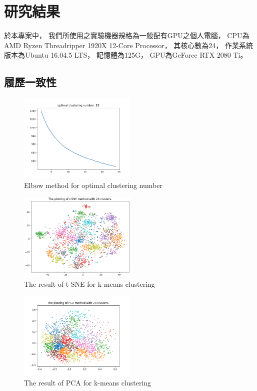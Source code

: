\documentclass[acmsmall]{acmart}
\begin{document}
\section{研究結果}

於本專案中，
我們所使用之實驗機器規格為一般配有GPU之個人電腦，
CPU為AMD Ryzen Threadripper 1920X 12-Core Processor，
其核心數為24，
作業系統版本為Ubuntu 16.04.5 LTS，
記憶體為125G，
GPU為GeForce RTX 2080 Ti。

\subsection{履歷一致性}

\begin{figure}
    \centerline{\includegraphics[width=0.5\textwidth]{elbow_method.png}}
    \caption{Elbow method for optimal clustering number}
    \label{elbow_method}
\end{figure}

\begin{figure}
    \centerline{\includegraphics[width=0.5\textwidth]{t_sne.png}}
    \caption{The result of t-SNE for k-means clustering}
    \label{t_sne}
\end{figure}

\begin{figure}
    \centerline{\includegraphics[width=0.5\textwidth]{pca.png}}
    \caption{The result of PCA for k-means clustering}
    \label{pca}
\end{figure}
\end{document}
